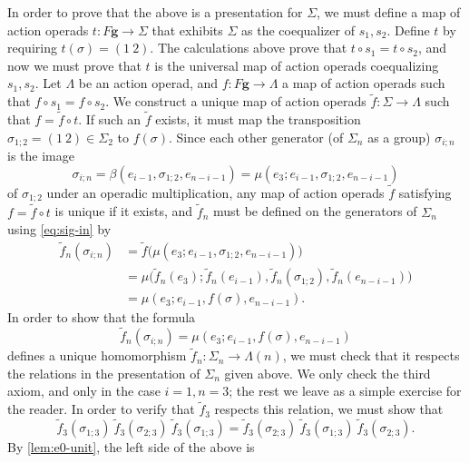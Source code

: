 \begin{example}
In order to prove that the above is a presentation for $\Sigma$, we must define a map of action operads $t \colon F\mathbf{g} \to \Sigma$ that exhibits $\Sigma$ as the coequalizer of $s_1, s_2$.
Define $t$ by requiring $t(\sigma) = (1 \ 2)$.
The calculations above prove that $t \circ s_1 = t \circ s_2$, and now we must prove that $t$ is the universal map of action operads coequalizing $s_1, s_2$.
Let $\Lambda$ be an action operad, and $f \colon F\mathbf{g} \to \Lambda$ a map of action operads such that $f \circ s_1 = f \circ s_2$.
We construct a unique map of action operads $\tilde{f} \colon \Sigma \to \Lambda$ such that $f = \tilde{f} \circ t$.
If such an $\tilde{f}$ exists, it must map the transposition $\sigma_{1;2} = (1 \ 2) \in \Sigma_2$ to $f(\sigma)$.
Since each other generator (of $\Sigma_n$ as a group) $\sigma_{i;n}$ is the image
\begin{equation}\label{eq:sig-in}
\sigma_{i;n} = \beta(e_{i-1}, \sigma_{1;2}, e_{n-i-1}) = \mu(e_3; e_{i-1}, \sigma_{1;2}, e_{n-i-1})
\end{equation}
of $\sigma_{1;2}$ under an operadic multiplication, any map of action operads $\tilde{f}$ satisfying $f = \tilde{f} \circ t$ is unique if it exists, and $\tilde{f}_n$ must be 
defined on the generators of $\Sigma_n$ using \cref{eq:sig-in} by
\begin{align*}
\tilde{f}_n(\sigma_{i;n}) & = \tilde{f} \big( \mu(e_3; e_{i-1}, \sigma_{1;2}, e_{n-i-1}) \big) \\
& = \mu\big( \tilde{f}_n(e_3); \tilde{f}_n(e_{i-1}), \tilde{f}_n(\sigma_{1;2}), \tilde{f}_n(e_{n-i-1}) \big) \\
& =  \mu(e_3; e_{i-1}, f(\sigma), e_{n-i-1}).
\end{align*}
In order to show that the formula 
\[
\tilde{f}_n(\sigma_{i;n}) = \mu(e_3; e_{i-1}, f(\sigma), e_{n-i-1})
\]
defines a unique homomorphism $\tilde{f}_n \colon \Sigma_n \to \Lambda(n)$, we must check that it respects the relations in the presentation of $\Sigma_n$ given above.
We only check the third axiom, and only in the case $i=1, n=3$; the rest we leave as a simple exercise for the reader.
In order to verify that $\tilde{f}_3$ respects this relation, we must show that
\begin{equation}\label{eq:3term}
\tilde{f}_3( \sigma_{1;3}) \ \tilde{f}_3(\sigma_{2;3} ) \ \tilde{f}_3(\sigma_{1;3} ) = \tilde{f}_3(\sigma_{2;3} ) \ \tilde{f}_3(\sigma_{1;3} ) \ \tilde{f}_3( \sigma_{2;3}).
\end{equation}
By \cref{lem:e0-unit}, the left side of the above is 
\begin{align*}

\end{align*}
\end{example}
